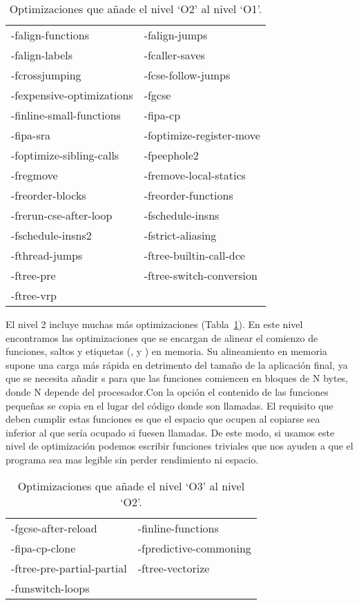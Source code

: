 \begin{table}[htb]
\begin{center}
	\begin{tabular}{|ll|}
		\hline
		-falign-functions & -falign-jumps\\
		-falign-labels & -fcaller-saves\\
		-fcrossjumping & -fcse-follow-jumps\\
		-fexpensive-optimizations & -fgcse\\
		-finline-small-functions & -fipa-cp\\
		-fipa-sra & -foptimize-register-move\\
		-foptimize-sibling-calls & -fpeephole2\\
		-fregmove & -fremove-local-statics\\
		-freorder-blocks & -freorder-functions\\
		-frerun-cse-after-loop & -fschedule-insns\\
		-fschedule-insns2 & -fstrict-aliasing\\
		-fthread-jumps & -ftree-builtin-call-dce\\
		-ftree-pre & -ftree-switch-conversion\\
		-ftree-vrp & \\
		\hline
	\end{tabular}
\end{center}
\caption{Optimizaciones que añade el nivel `O2' al nivel `O1'.}
\label{opt2}
\end{table}

El nivel 2 incluye muchas más optimizaciones (Tabla~\ref{opt2}). En este nivel encontramos las optimizaciones  que se encargan de alinear el comienzo de funciones, saltos y etiquetas (,  y ) en memoria. Su alineamiento en memoria supone una carga más rápida en detrimento del tamaño de la aplicación final, ya que se necesita añadir s para que las funciones comiencen en bloques de N bytes, donde N depende del procesador.Con la opción  el contenido de las funciones pequeñas se copia en el lugar del código donde son llamadas. El requisito que deben cumplir estas funciones es que el espacio que ocupen al copiarse sea inferior al que sería ocupado si fuesen llamadas. De este modo, si usamos este nivel de optimización podemos escribir funciones triviales que nos ayuden a que el programa sea mas legible sin perder rendimiento ni espacio.

\begin{table}[htb]
\begin{center}
	\begin{tabular}{|ll|}
		\hline
		-fgcse-after-reload & -finline-functions\\
		-fipa-cp-clone & -fpredictive-commoning\\
		-ftree-pre-partial-partial & -ftree-vectorize\\
		-funswitch-loops & \\
		\hline
	\end{tabular}
\end{center}
\caption{Optimizaciones que añade el nivel `O3' al nivel `O2'.}
\label{opt3}
\end{table}

